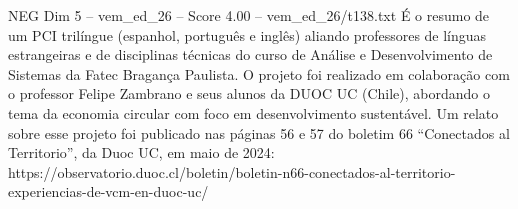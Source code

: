 \begin{textsample}{NEG Dim 5 – vem\_ed\_26 – Score 4.00 – vem\_ed\_26/t138.txt}
É o resumo de um PCI trilíngue (espanhol, português e inglês) aliando professores de línguas estrangeiras e de disciplinas técnicas do curso de Análise e Desenvolvimento de Sistemas da Fatec Bragança Paulista.
O projeto foi realizado em colaboração com o professor Felipe Zambrano e seus alunos da DUOC UC (Chile), abordando o tema da economia circular com foco em desenvolvimento sustentável.
Um relato sobre esse projeto foi publicado nas páginas 56 e 57 do boletim 66 “Conectados al Territorio”, da Duoc UC, em maio de 2024: https://observatorio.duoc.cl/boletin/boletin-n66-conectados-al-territorio-experiencias-de-vcm-en-duoc-uc/

\end{textsample}
